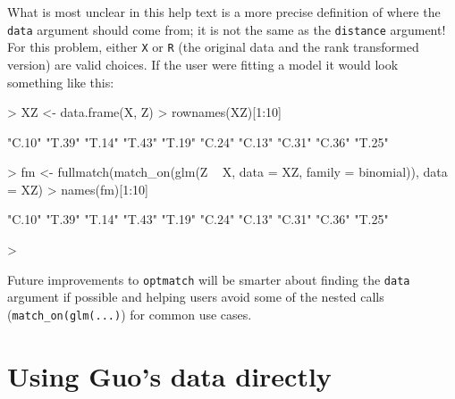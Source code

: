 \documentclass{article}
\begin{document}
What is most unclear in this help text is a more precise definition of where
the \texttt{data} argument should come from; it is not the same as the
\texttt{distance} argument! For this problem, either \texttt{X} or \texttt{R}
(the original data and the rank transformed version) are valid choices. If the
user were fitting a model it would look something like this:

\begin{Schunk}
\begin{Sinput}
> XZ <- data.frame(X, Z)
> rownames(XZ)[1:10]
\end{Sinput}
\begin{Soutput}
 [1] "C.10" "T.39" "T.14" "T.43" "T.19" "C.24" "C.13" "C.31" "C.36" "T.25"
\end{Soutput}
\begin{Sinput}
> fm <- fullmatch(match_on(glm(Z ~ X, data = XZ, family = binomial)), data = XZ)
> names(fm)[1:10]
\end{Sinput}
\begin{Soutput}
 [1] "C.10" "T.39" "T.14" "T.43" "T.19" "C.24" "C.13" "C.31" "C.36" "T.25"
\end{Soutput}
\begin{Sinput}
> 
\end{Sinput}
\end{Schunk}

Future improvements to \texttt{optmatch} will be smarter about finding the
\texttt{data} argument if possible and helping users avoid some of the nested
calls (\texttt{match\_on(glm(...)}) for common use cases.

\section{Using Guo's data directly}
\end{document}
